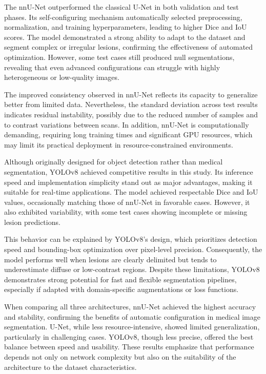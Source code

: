 \documentclass[12pt]{article}
\begin{document}
The nnU-Net outperformed the classical U-Net in both validation and test phases. Its self-configuring mechanism automatically selected preprocessing, normalization, and training hyperparameters, leading to higher Dice and IoU scores. The model demonstrated a strong ability to adapt to the dataset and segment complex or irregular lesions, confirming the effectiveness of automated optimization. However, some test cases still produced null segmentations, revealing that even advanced configurations can struggle with highly heterogeneous or low-quality images.

The improved consistency observed in nnU-Net reflects its capacity to generalize better from limited data. Nevertheless, the standard deviation across test results indicates residual instability, possibly due to the reduced number of samples and to contrast variations between scans. In addition, nnU-Net is computationally demanding, requiring long training times and significant GPU resources, which may limit its practical deployment in resource-constrained environments.

Although originally designed for object detection rather than medical segmentation, YOLOv8 achieved competitive results in this study. Its inference speed and implementation simplicity stand out as major advantages, making it suitable for real-time applications. The model achieved respectable Dice and IoU values, occasionally matching those of nnU-Net in favorable cases. However, it also exhibited variability, with some test cases showing incomplete or missing lesion predictions.

This behavior can be explained by YOLOv8’s design, which prioritizes detection speed and bounding-box optimization over pixel-level precision. Consequently, the model performs well when lesions are clearly delimited but tends to underestimate diffuse or low-contrast regions. Despite these limitations, YOLOv8 demonstrates strong potential for fast and flexible segmentation pipelines, especially if adapted with domain-specific augmentations or loss functions.

When comparing all three architectures, nnU-Net achieved the highest accuracy and stability, confirming the benefits of automatic configuration in medical image segmentation. U-Net, while less resource-intensive, showed limited generalization, particularly in challenging cases. YOLOv8, though less precise, offered the best balance between speed and usability. These results emphasize that performance depends not only on network complexity but also on the suitability of the architecture to the dataset characteristics. 
\end{document}
